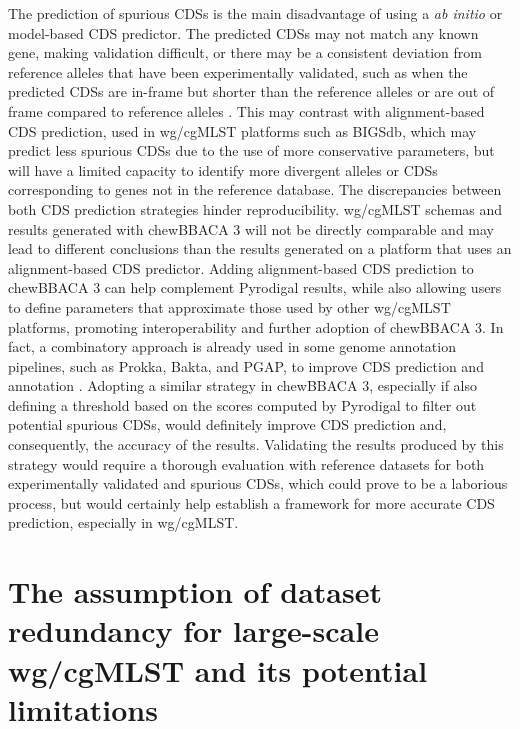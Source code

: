 The prediction of spurious \acp{CDS} is the main disadvantage of using a \textit{ab initio} or model-based \ac{CDS} predictor. The predicted \acp{CDS} may not match any known gene, making validation difficult, or there may be a consistent deviation from reference alleles that have been experimentally validated, such as when the predicted \acp{CDS} are in-frame but shorter than the reference alleles or are out of frame compared to reference alleles \cite{dimonaco_no_2022}. This may contrast with alignment-based \ac{CDS} prediction, used in \ac{wg/cgMLST} platforms such as \ac{BIGSdb}, which may predict less spurious \acp{CDS} due to the use of more conservative parameters, but will have a limited capacity to identify more divergent alleles or \acp{CDS} corresponding to genes not in the reference database. The discrepancies between both \ac{CDS} prediction strategies hinder reproducibility. \ac{wg/cgMLST} schemas and results generated with chewBBACA 3 will not be directly comparable and may lead to different conclusions than the results generated on a platform that uses an alignment-based \ac{CDS} predictor. Adding alignment-based \ac{CDS} prediction to chewBBACA 3 can help complement Pyrodigal results, while also allowing users to define parameters that approximate those used by other \ac{wg/cgMLST} platforms, promoting interoperability and further adoption of chewBBACA 3. In fact, a combinatory approach is already used in some genome annotation pipelines, such as Prokka, Bakta, and PGAP, to improve \ac{CDS} prediction and annotation \cite{seemann_prokka_2014, schwengers_bakta_2021, li_refseq_2021}. Adopting a similar strategy in chewBBACA 3, especially if also defining a threshold based on the scores computed by Pyrodigal to filter out potential spurious \acp{CDS}, would definitely improve \ac{CDS} prediction and, consequently, the accuracy of the results. Validating the results produced by this strategy would require a thorough evaluation with reference datasets for both experimentally validated and spurious \acp{CDS}, which could prove to be a laborious process, but would certainly help establish a framework for more accurate \ac{CDS} prediction, especially in \ac{wg/cgMLST}.

\section{The assumption of dataset redundancy for large-scale wg/cgMLST and its potential limitations}

